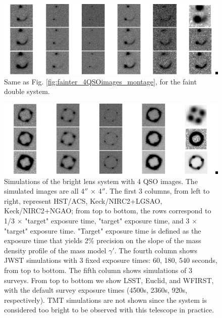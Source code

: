 \documentclass[a4paper,11pt]{article}
\begin{document}
\begin{figure}
\begin{center}
\includegraphics[width=1.0\textwidth]{figures/fainter_system_2QSOimages_all.png}
\end{center}
\caption{Same as Fig. \ref{fig:fainter_4QSOimages_montage}, for the faint double system.}
\label{fig:fainter_2QSOimages_montage}
\end{figure}

\begin{figure}
\begin{center}
\includegraphics[width=1.0\textwidth]{figures/brighter_system_4QSOimages_all.png}
\end{center}
\caption{Simulations of the bright lens system with 4 QSO images. The simulated images are all 4$''$ $\times$ 4$''$. The first 3 columns, from left to right, represent HST/ACS, Keck/NIRC2+LGSAO, Keck/NIRC2+NGAO; from top to bottom, the rows correspond to 1/3 $\times$ "target" exposure time, "target" exposure time, and 3 $\times$ "target" exposure time. "Target" exposure time is defined as the exposure time that yields 2\% precision on the slope of the mass density profile of the mass model $\gamma'$. The fourth column shows JWST simulations with 3 fixed exposure times: 60, 180, 540 seconds, from top to bottom. The fifth column
shows simulations of 3 surveys. From top to bottom we show LSST, Euclid, and WFIRST, with the default survey exposure times (4500s, 2360s, 920s, respectively). TMT simulations are not shown since the system is considered too bright to be observed with this telescope in practice.}
\label{fig:brighter_4QSOimages_montage}
\end{figure}
\end{document}
